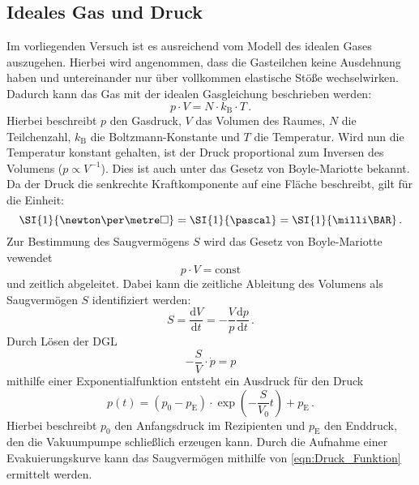     \subsection{Ideales Gas und Druck}
        Im vorliegenden Versuch ist es ausreichend vom Modell des idealen Gases auszugehen.
        Hierbei wird angenommen, dass die Gasteilchen keine Ausdehnung haben und untereinander nur über vollkommen elastische Stöße wechselwirken.
        Dadurch kann das Gas mit der idealen Gasgleichung beschrieben werden:
        \begin{equation*}
            p \cdot V = N \cdot k_\text{B} \cdot T \, .
        \end{equation*}
        Hierbei beschreibt $p$ den Gasdruck, $V$ das Volumen des Raumes, $N$ die Teilchenzahl, $k_\text{B}$ die Boltzmann-Konstante und $T$ die Temperatur.
        Wird nun die Temperatur konstant gehalten, ist der Druck proportional zum Inversen des Volumens ($p \propto V^{-1}$).
        Dies ist auch unter das Gesetz von Boyle-Mariotte bekannt.
        \noindent
        Da der Druck die senkrechte Kraftkomponente auf eine Fläche beschreibt, gilt für die Einheit:
        \begin{equation*}
            \SI{1}{\newton\per\metre\square} = \SI{1}{\pascal} = \SI{1}{\milli\BAR} \, .
        \end{equation*}
        \noindent
        Zur Bestimmung des Saugvermögens $S$ wird das Gesetz von Boyle-Mariotte vewendet
        \begin{equation*}
            p \cdot V = \text{const}
        \end{equation*}
        und zeitlich abgeleitet.
        Dabei kann die zeitliche Ableitung des Volumens als Saugvermögen $S$ identifiziert werden:
        \begin{equation*}
            S = \frac{\text{d}V}{\text{d}t} = - \frac{V}{p} \frac{\text{d}p}{\text{d}t} \, .
        \end{equation*}
        Durch Lösen der DGL
        \begin{equation*}
            - \frac{S}{V} \cdot \dot{p} = p
        \end{equation*}
        mithilfe einer Exponentialfunktion entsteht ein Ausdruck für den Druck
        \begin{equation}
            p(t) = (p_0 - p_\text{E}) \cdot \exp{(- \frac{S}{V_0}t)} +p_\text{E} \, .
            \label{eqn:Druck_Funktion}
        \end{equation}
        Hierbei beschreibt $p_0$ den Anfangsdruck im Rezipienten und $p_\text{E}$ den Enddruck, den die Vakuumpumpe schließlich erzeugen kann.
        Durch die Aufnahme einer Evakuierungskurve kann das Saugvermögen mithilfe von \eqref{eqn:Druck_Funktion} ermittelt werden.

